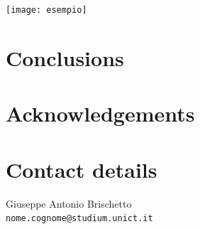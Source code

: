 \documentclass[10pt,foldmark,notumble]{leaflet}
\begin{document}
\lipsum[11]

\texttt{[image: esempio]}

\lipsum[12-13]

\section{Conclusions}

\lipsum[14]

\section{Acknowledgements}

\lipsum[1]

\section{Contact details}

Giuseppe Antonio Brischetto\\ {\tt nome.cognome@studium.unict.it}
\end{document}
